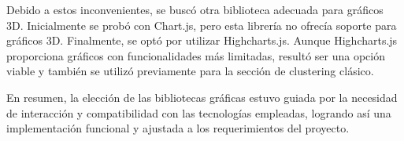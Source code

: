 
Debido a estos inconvenientes, se buscó otra biblioteca adecuada para gráficos 3D. Inicialmente se probó con Chart.js, pero esta librería no ofrecía soporte para gráficos 3D. Finalmente, se optó por utilizar Highcharts.js. Aunque Highcharts.js proporciona gráficos con funcionalidades más limitadas, resultó ser una opción viable y también se utilizó previamente para la sección de clustering clásico.

En resumen, la elección de las bibliotecas gráficas estuvo guiada por la necesidad de interacción y compatibilidad con las tecnologías empleadas, logrando así una implementación funcional y ajustada a los requerimientos del proyecto.